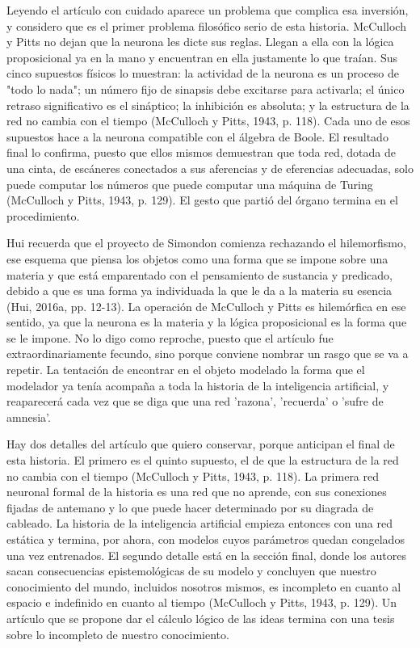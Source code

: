 Leyendo el artículo con cuidado aparece un problema que complica esa inversión, y considero que es el primer problema filosófico serio de esta historia. McCulloch y Pitts no dejan que la neurona les dicte sus reglas. Llegan a ella con la lógica proposicional ya en la mano y encuentran en ella justamente lo que traían. Sus cinco supuestos físicos lo muestran: la actividad de la neurona es un proceso de "todo lo nada"; un número fijo de sinapsis debe excitarse para activarla; el único retraso significativo es el sináptico; la inhibición es absoluta; y la estructura de la red no cambia con el tiempo (McCulloch y Pitts, 1943, p. 118). Cada uno de esos supuestos hace a la neurona compatible con el álgebra de Boole. El resultado final lo confirma, puesto que ellos mismos demuestran que toda red, dotada de una cinta, de escáneres conectados a sus aferencias y de eferencias adecuadas, solo puede computar los números que puede computar una máquina de Turing (McCulloch y Pitts, 1943, p. 129). El gesto que partió del órgano termina en el procedimiento.

Hui recuerda que el proyecto de Simondon comienza rechazando el hilemorfismo, ese esquema que piensa los objetos como una forma que se impone sobre una materia y que está emparentado con el pensamiento de sustancia y predicado, debido a que es una forma ya individuada la que le da a la materia su esencia (Hui, 2016a, pp. 12-13). La operación de McCulloch y Pitts es hilemórfica en ese sentido, ya que la neurona es la materia y la lógica proposicional es la forma que se le impone. No lo digo como reproche, puesto que el artículo fue extraordinariamente fecundo, sino porque conviene nombrar un rasgo que se va a repetir. La tentación de encontrar en el objeto modelado la forma que el modelador ya tenía acompaña a toda la historia de la inteligencia artificial, y reaparecerá cada vez que se diga que una red 'razona', 'recuerda' o 'sufre de amnesia'.

Hay dos detalles del artículo que quiero conservar, porque anticipan el final de esta historia. El primero es el quinto supuesto, el de que la estructura de la red no cambia con el tiempo (McCulloch y Pitts, 1943, p. 118). La primera red neuronal formal de la historia es una red que no aprende, con sus conexiones fijadas de antemano y lo que puede hacer determinado por su diagrada de cableado. La historia de la inteligencia artificial empieza entonces con una red estática y termina, por ahora, con modelos cuyos parámetros quedan congelados una vez entrenados. El segundo detalle está en la sección final, donde los autores sacan consecuencias epistemológicas de su modelo y concluyen que nuestro conocimiento del mundo, incluidos nosotros mismos, es incompleto en cuanto al espacio e indefinido en cuanto al tiempo (McCulloch y Pitts, 1943, p. 129). Un artículo que se propone dar el cálculo lógico de las ideas termina con una tesis sobre lo incompleto de nuestro conocimiento.

